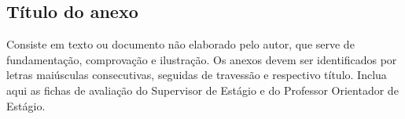\documentclass[
	12pt,				%
	openright,			%
	oneside,			%
	a4paper,			%
	english,			%
	french,				%
	spanish,			%
	brazil				%
	]{abntex2}
\begin{document}

\begin{anexosenv}


\chapter{Título do anexo}
Consiste em texto ou documento não elaborado pelo autor, que serve de fundamentação, comprovação e ilustração. Os anexos devem ser identificados por letras maiúsculas consecutivas, seguidas de travessão e respectivo título. Inclua aqui as fichas de avaliação do Supervisor de Estágio e do Professor Orientador de Estágio.

\end{anexosenv}

\printindex
\end{document}
